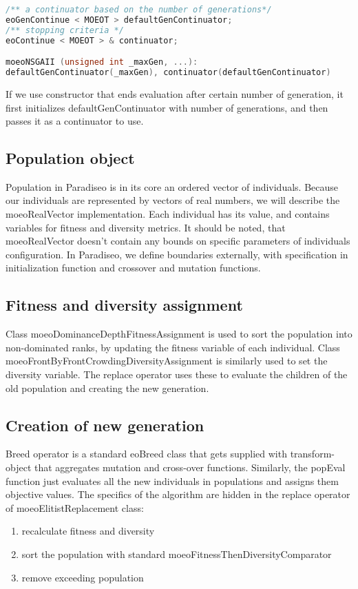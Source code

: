 \documentclass[12pt,oneside]{fithesis2}
\begin{document}
\begin{lstlisting}[language=C++,label=composition,caption=Object composition in Paradiseo]
/** a continuator based on the number of generations*/
eoGenContinue < MOEOT > defaultGenContinuator;
/** stopping criteria */
eoContinue < MOEOT > & continuator;

moeoNSGAII (unsigned int _maxGen, ...):
defaultGenContinuator(_maxGen), continuator(defaultGenContinuator)
\end{lstlisting}

If we use constructor that ends evaluation after certain number of generation, it first initializes defaultGenContinuator with number of generations, and then passes it as a continuator to use. 

\subsection{Population object}
Population in Paradiseo is in its core an ordered vector of individuals. Because our individuals are represented by vectors of real numbers, we will describe the moeoRealVector implementation. Each individual has its value, and contains variables for fitness and diversity metrics. It should be noted, that moeoRealVector doesn't contain any bounds on specific parameters of individuals configuration. In Paradiseo, we define boundaries externally, with specification in initialization function and crossover and mutation functions. 

\subsection{Fitness and diversity assignment}

Class moeoDominanceDepthFitnessAssignment is used to sort the population into non-dominated ranks, by updating the fitness variable of each individual. Class moeoFrontByFrontCrowdingDiversityAssignment is similarly used to set the diversity variable. The replace operator uses these to evaluate the children of the old population and creating the new generation.

\subsection{Creation of new generation}

Breed operator is a standard eoBreed class that gets supplied with transform-object that aggregates mutation and cross-over functions. Similarly, the popEval function just evaluates all the new individuals in populations and assigns them objective values. The specifics of the algorithm are hidden in the replace operator of moeoElitistReplacement class:
\begin{enumerate}
\item recalculate fitness and diversity
\item sort the population with standard moeoFitnessThenDiversityComparator
\item remove exceeding population
\end{enumerate}
\end{document}
